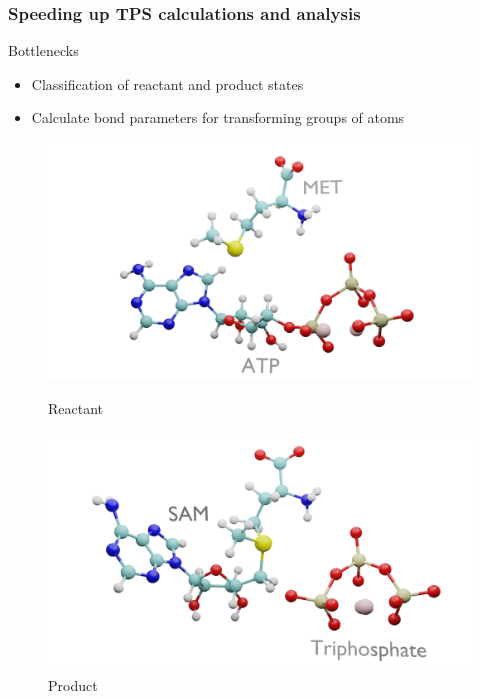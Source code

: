 \documentclass{beamer}
\begin{document}
\begin{frame}
\frametitle{Speeding up TPS calculations and analysis}
\begin{block}{Bottlenecks}
\begin{itemize}
\item Classification of reactant and product states
\end{itemize}
\end{block}
\pause
\begin{itemize}
\item Calculate bond parameters for transforming groups of atoms 
\end{itemize}
\begin{figure}
\centering
\begin{minipage}[b]{0.45\linewidth}
\includegraphics[scale=0.09]{figures/mat2a-reactant.png}
\caption{Reactant}
\label{fig:minipage1}
\end{minipage}
\quad
\begin{minipage}[b]{0.45\linewidth}
\includegraphics[scale=0.09]{figures/mat2a-prod.png}
\caption{Product}
\label{fig:minipage2}
\end{minipage}
\end{figure}
\end{frame}
\end{document}
